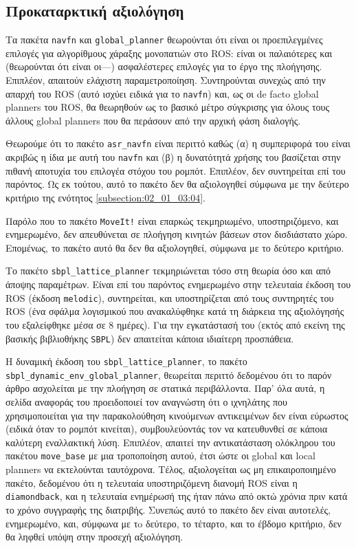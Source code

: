 \subsection{Προκαταρκτική αξιολόγηση}
  \label{subsection:02_01_04:01}

Τα πακέτα \texttt{navfn} και \texttt{global\_planner} θεωρούνται ότι είναι οι
προεπιλεγμένες επιλογές για αλγορίθμους χάραξης μονοπατιών στο ROS: είναι οι
παλαιότερες και (θεωρούνται ότι είναι οι---) ασφαλέστερες επιλογές για το έργο
της πλοήγησης. Επιπλέον, απαιτούν ελάχιστη παραμετροποίηση. Συντηρούνται συνεχώς
από την απαρχή του ROS (αυτό ισχύει ειδικά για το \texttt{navfn}) και,
ως οι de facto global planners του ROS, θα θεωρηθούν ως το βασικό μέτρο
σύγκρισης για όλους τους άλλους global planners που θα περάσουν από την αρχική
φάση διαλογής.

Θεωρούμε ότι το πακέτο \texttt{asr\_navfn} είναι περιττό καθώς (α) η
συμπεριφορά του είναι ακριβώς η ίδια με αυτή του \texttt{navfn} και (β) η
δυνατότητά χρήσης του βασίζεται στην πιθανή αποτυχία του επιλογέα στόχου του
ρομπότ. Επιπλέον, δεν συντηρείται επί του παρόντος. Ως εκ τούτου, αυτό το
πακέτο δεν θα αξιολογηθεί σύμφωνα με την δεύτερο κριτήριο της ενότητος
\ref{subsection:02_01_03:04}.

Παρόλο που το πακέτο \texttt{MoveIt!} είναι επαρκώς τεκμηριωμένο,
υποστηριζόμενο, και ενημερωμένο, δεν απευθύνεται σε πλοήγηση κινητών βάσεων
στον δισδιάστατο χώρο. Επομένως, το πακέτο αυτό θα δεν θα αξιολογηθεί, σύμφωνα
με το δεύτερο κριτήριο.

Το πακέτο \texttt{sbpl\_lattice\_planner} τεκμηριώνεται τόσο στη θεωρία όσο και
από άποψης παραμέτρων. Είναι επί του παρόντος ενημερωμένο στην τελευταία έκδοση
του ROS (έκδοση \texttt{melodic}), συντηρείται, και υποστηρίζεται από τους
συντηρητές του ROS (ένα σφάλμα λογισμικού που ανακαλύφθηκε κατά τη διάρκεια της
αξιολόγησής του εξαλείφθηκε μέσα σε $8$ ημέρες). Για την εγκατάστασή του
(εκτός από εκείνη της βασικής βιβλιοθήκης \texttt{SBPL}) δεν απαιτείται κάποια
ιδιαίτερη προσπάθεια.

Η δυναμική έκδοση του \texttt{sbpl\_lattice\_planner}, το πακέτο
\texttt{sbpl\_dynamic\_env\_global\_planner}, θεωρείται περιττό δεδομένου ότι το
παρόν άρθρο ασχολείται με την πλοήγηση σε στατικά περιβάλλοντα.  Παρ' όλα αυτά,
η σελίδα αναφοράς του προειδοποιεί τον αναγνώστη ότι ο ιχνηλάτης που
χρησιμοποιείται για την παρακολούθηση κινούμενων αντικειμένων δεν είναι
εύρωστος (ειδικά όταν το ρομπότ κινείται), συμβουλεύοντάς τον να κατευθυνθεί σε
κάποια καλύτερη εναλλακτική λύση. Επιπλέον, απαιτεί την αντικατάσταση ολόκληρου
του πακέτου \texttt{move\_base} με μια τροποποίηση αυτού, έτσι ώστε οι global
και local planners να εκτελούνται ταυτόχρονα. Τέλος, αξιολογείται ως μη
επικαιροποιημένο πακέτο, δεδομένου ότι η τελευταία υποστηριζόμενη διανομή ROS
είναι η \texttt{diamondback}, και η τελευταία ενημέρωσή της ήταν πάνω από οκτώ
χρόνια πριν κατά το χρόνο συγγραφής της διατριβής. Συνεπώς αυτό το πακέτο δεν
είναι αυτοτελές, ενημερωμένο, και, σύμφωνα με τo δεύτερο, το τέταρτο, και το
έβδομο κριτήριο, δεν θα ληφθεί υπόψη στην προσεχή αξιολόγηση.

